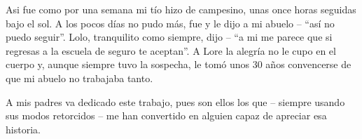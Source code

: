 \documentclass[11pt]{book}
\begin{document}
Asi fue como por una semana mi tío hizo de campesino, unas once horas seguidas bajo el sol.
A los pocos días no pudo más, fue y le dijo a mi abuelo -- ``así no puedo seguir''.
Lolo, tranquilito como siempre, dijo -- ``a mi me parece que si regresas a la escuela de seguro te aceptan''.
A Lore la alegr\'ia no le cupo en el cuerpo y, aunque siempre tuvo la sospecha, le tom\'o unos 30 años convencerse de que mi abuelo no trabajaba tanto.

A mis padres va dedicado este trabajo, pues son ellos los que -- siempre usando sus modos retorcidos -- me han convertido en alguien capaz de apreciar esa historia.
\vspace*{\fill}
\thispagestyle{empty}

\newpage\thispagestyle{empty}\addtocounter{page}{-1}
~\newpage\thispagestyle{empty}\addtocounter{page}{-1}


\newpage\thispagestyle{empty}\addtocounter{page}{-1}
~\newpage\thispagestyle{empty}\addtocounter{page}{-1}




\setcounter{page}{1}


\markboth{}{}
\thispagestyle{empty}


\newpage\thispagestyle{empty}\addtocounter{page}{-1}
~\newpage\thispagestyle{empty}\addtocounter{page}{-1}

{}
\tableofcontents%

\printglossaries



\end{document}
